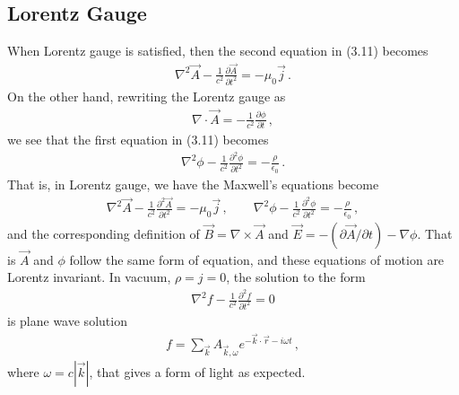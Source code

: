 \documentclass[11pt, onesided]{book}
\theoremstyle{break}
\theoremstyle{break}
\newcommand{\pd}{\partial}
\begin{document}
\subsection{Lorentz Gauge}
When Lorentz gauge is satisfied, then the second equation in (3.11) becomes
\begin{align*}
\nabla^2 \vec{A} - \frac{1}{c^2}\frac{\pd \vec{A}}{\pd t^2} = -\mu_0 \vec{j}\,.
\end{align*}
On the other hand, rewriting the Lorentz gauge as
\begin{align*}
\nabla \cdot \vec{A} = -\frac{1}{c^2} \frac{\pd\phi}{\pd t}\,,
\end{align*}
we see that the first equation in (3.11) becomes
\begin{align*}
\nabla^2 \phi - \frac{1}{c^2} \frac{\pd^2 \phi}{\pd t^2} = -\frac{\rho}{\epsilon_0}\,.
\end{align*}
That is, in Lorentz gauge, we have the Maxwell's equations become
\begin{align}
\nabla^2 \vec{A} - \frac{1}{c^2}\frac{\pd^2 \vec{A}}{\pd t^2} = -\mu_0 \vec{j}
\,,\qquad
\nabla^2 \phi - \frac{1}{c^2} \frac{\pd^2 \phi}{\pd t^2} = -\frac{\rho}{\epsilon_0}\,,
\end{align}
and the corresponding definition of $\vec{B} = \nabla \times \vec{A}$ and $\vec{E} = -(\pd\vec{A}/\pd t)- \nabla \phi$. That is $\vec{A}$ and $\phi$ follow the same form of equation, and these equations of motion are Lorentz invariant. In vacuum, $\rho = j = 0$, the solution to the form
\begin{align*}
\nabla^2 f - \frac{1}{c^2}\frac{\pd^2 f}{\pd t^2} = 0
\end{align*}
is plane wave solution
\begin{align*}
f = \sum_{\vec{k}} A_{\vec{k},\omega} e^{-\vec{k}\cdot \vec{r}-i\omega t}\,,
\end{align*}
where $\omega = c|\vec{k}|$, that gives a form of light as expected.\\
\end{document}
